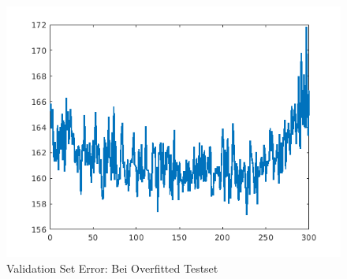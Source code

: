 \documentclass{hbrs-ecta-report}
\begin{document}
\begin{figure}[ht!]
	\centering
	\includegraphics[width=\linewidth]{img/validationErrorOverfitted}
	\caption{Validation Set Error: Bei Overfitted Testset}
	\label{fig:validationerroroverfitted}
\end{figure}
\end{document}
